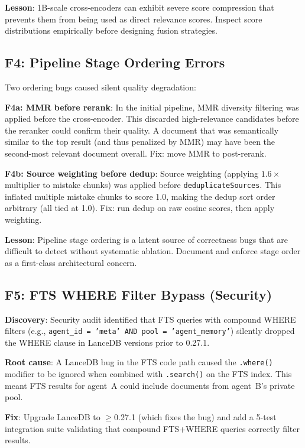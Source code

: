 \documentclass[11pt]{article}
\begin{document}
\textbf{Lesson}: 1B-scale cross-encoders can exhibit severe score compression that
prevents them from being used as direct relevance scores. Inspect score distributions
empirically before designing fusion strategies.

\subsection{F4: Pipeline Stage Ordering Errors}
\label{sec:failures:F4}

Two ordering bugs caused silent quality degradation:

\textbf{F4a: MMR before rerank}: In the initial pipeline, MMR diversity filtering
was applied before the cross-encoder. This discarded high-relevance candidates before
the reranker could confirm their quality. A document that was semantically similar to
the top result (and thus penalized by MMR) may have been the second-most relevant
document overall. Fix: move MMR to post-rerank.

\textbf{F4b: Source weighting before dedup}: Source weighting (applying $1.6\times$
multiplier to mistake chunks) was applied before \texttt{deduplicateSources}. This
inflated multiple mistake chunks to score 1.0, making the dedup sort order arbitrary
(all tied at 1.0). Fix: run dedup on raw cosine scores, then apply weighting.

\textbf{Lesson}: Pipeline stage ordering is a latent source of correctness bugs that
are difficult to detect without systematic ablation. Document and enforce stage order as
a first-class architectural concern.

\subsection{F5: FTS WHERE Filter Bypass (Security)}
\label{sec:failures:F5}

\textbf{Discovery}: Security audit identified that FTS queries with compound
WHERE filters (e.g., \texttt{agent\_id = 'meta' AND pool = 'agent\_memory'}) silently
dropped the WHERE clause in LanceDB versions prior to 0.27.1.

\textbf{Root cause}: A LanceDB bug in the FTS code path caused the \texttt{.where()}
modifier to be ignored when combined with \texttt{.search()} on the FTS index. This
meant FTS results for agent~A could include documents from agent~B's private pool.

\textbf{Fix}: Upgrade LanceDB to $\geq$0.27.1 (which fixes the bug) and add a 5-test
integration suite validating that compound FTS+WHERE queries correctly filter results.
\end{document}
